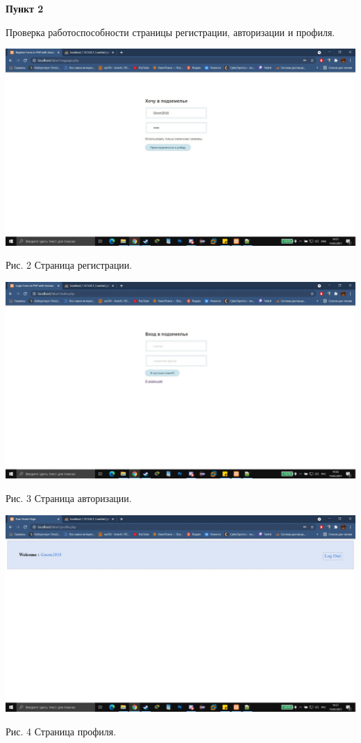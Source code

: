 \documentclass[a4paper,14pt]{extarticle}
\begin{document}
    \textbf{Пункт 2}
    \vspace{-3ex}
    \begin{center}
        \singlespacing
        Проверка работоспособности страницы регистрации, авторизации и профиля.

        \includegraphics[scale=0.25]{pics/3.jpg}

        Рис. 2 Страница регистрации.

        \includegraphics[scale=0.25]{pics/2.jpg}

        Рис. 3 Страница авторизации.
        \vspace{1ex}

        \includegraphics[scale=0.25]{pics/4.jpg}

        Рис. 4 Страница профиля.

    \end{center}
\end{document}
